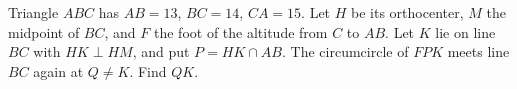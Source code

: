 Triangle $ABC$ has $AB=13$, $BC=14$, $CA=15$. Let $H$ be its orthocenter, $M$ the midpoint of $BC$, and $F$ the foot of the altitude from $C$ to $AB$. Let $K$ lie on line $BC$ with $HK\perp HM$, and put $P=HK\cap AB$. The circumcircle of $FPK$ meets line $BC$ again at $Q\ne K$. Find $QK$.
